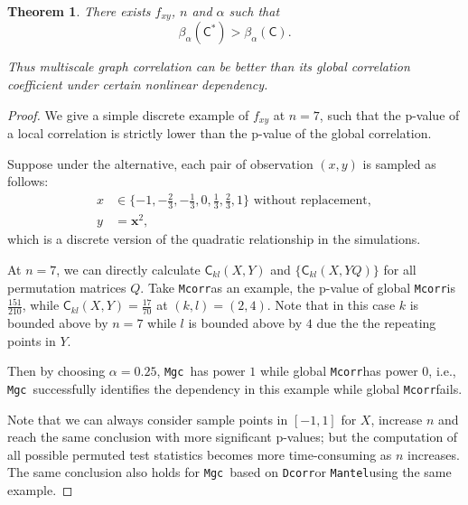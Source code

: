 \documentclass[11pt]{article}
\providecommand{\sct}[1]{{\sc \texttt{#1}}}
\providecommand{\mb}[1]{\boldsymbol{#1}}
\newcommand{\G}{\mathsf{C}}
\newcommand{\Mgc}{\sct{Mgc}}
\newcommand{\Dcorr}{\sct{Dcorr}}
\newcommand{\Mcorr}{\sct{Mcorr}}
\newcommand{\Mantel}{\sct{Mantel}}
\newtheorem{appThm}{Theorem}
\begin{document}
\begin{appThm}
There exists $f_{xy}$, $n$ and $\alpha$ such that 
\begin{equation}
\beta_{\alpha}(\G^{*}) > \beta_{\alpha}(\G).
\end{equation}

Thus multiscale graph correlation can be better than its global correlation coefficient under certain nonlinear dependency.
\end{appThm}
\begin{proof}
We give a simple discrete example of $f_{xy}$ at $n=7$, such that the p-value of a local correlation is strictly lower than the p-value of the global correlation. %

Suppose under the alternative, each pair of observation $(x,y)$ is sampled as follows:
\begin{align*} 
x &\in \{-1,-\frac{2}{3},-\frac{1}{3},0,\frac{1}{3},\frac{2}{3},1\} \mbox{ without replacement}, \\
y &= \mb{x}^2,
\end{align*}
which is a discrete version of the quadratic relationship in the simulations.

At $n=7$, we can directly calculate $\G_{kl}(X, Y)$ and $\{\G_{kl}(X, YQ)\}$ for all permutation matrices $Q$. Take \Mcorr as an example, the p-value of global \Mcorr is $\frac{151}{210}$, while $\G_{kl}(X, Y)=\frac{17}{70}$ at $(k,l)=(2,4)$. Note that in this case $k$ is bounded above by $n=7$ while $l$ is bounded above by $4$ due the the repeating points in $Y$. 

Then by choosing $\alpha=0.25$, \Mgc~has power $1$ while global \Mcorr has power $0$, i.e., \Mgc~successfully identifies the dependency in this example while global \Mcorr fails. 

Note that we can always consider sample points in $[-1,1]$ for $X$, increase $n$ and reach the same conclusion with more significant p-values; but the computation of all possible permuted test statistics becomes more time-consuming as $n$ increases. The same conclusion also holds for \Mgc~based on \Dcorr or \Mantel using the same example.
\end{proof}



\end{document}
